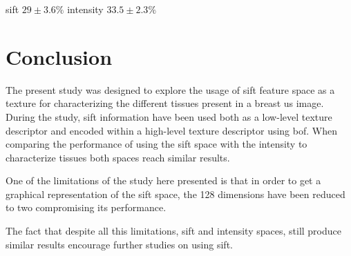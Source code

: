 \documentclass[a4paper, 10pt, conference]{llncs}      %
\begin{document}
sift $29\pm3.6\%$
intensity $33.5\pm2.3\%$

\section{Conclusion} 
The present study was designed to explore the usage of \ac{sift} feature space as a texture for characterizing the different tissues present in a breast \ac{us} image. During the study, \ac{sift} information have been used both as a low-level texture descriptor and encoded within a high-level texture descriptor using \ac{bof}. When comparing the performance of using the \ac{sift} space with the intensity to characterize tissues both spaces reach similar results. 

One of the limitations of the study here presented is that in order to get a graphical representation of the \ac{sift} space, the 128 dimensions have been reduced to two compromising its performance. 

The fact that despite all this limitations, \ac{sift} and intensity spaces, still produce similar results encourage further studies on using \ac{sift}.


%


\end{document}

